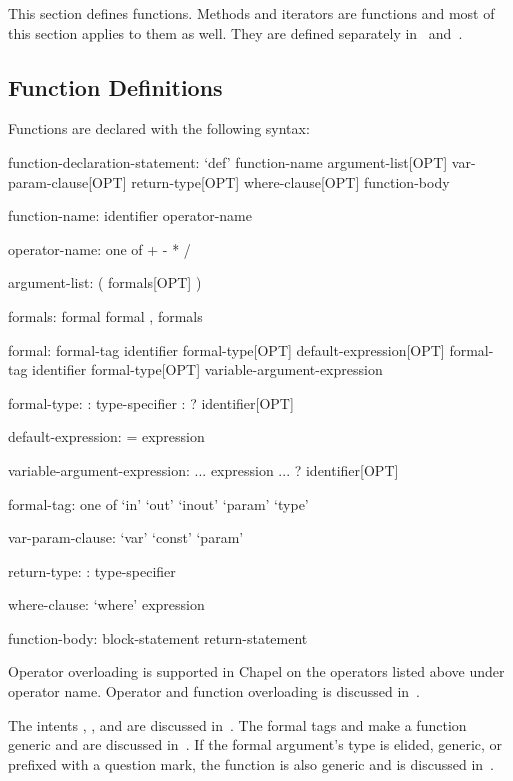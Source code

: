 \label{Functions}

This section defines functions.  Methods and iterators are functions
and most of this section applies to them as well.  They are defined
separately in~ and~.

\subsection{Function Definitions}
\label{Function_Definitions}

Functions are declared with the following syntax:
\begin{syntax}
function-declaration-statement:
  `def' function-name argument-list[OPT] var-param-clause[OPT]
    return-type[OPT] where-clause[OPT] function-body

function-name:
  identifier
  operator-name

operator-name: one of
  + - * / %

argument-list:
  ( formals[OPT] )

formals:
  formal
  formal , formals

formal:
  formal-tag identifier formal-type[OPT] default-expression[OPT]
  formal-tag identifier formal-type[OPT] variable-argument-expression

formal-type:
  : type-specifier
  : ? identifier[OPT]

default-expression:
  = expression

variable-argument-expression:
  ... expression
  ... ? identifier[OPT]

formal-tag: one of
  `in' `out' `inout' `param' `type'

var-param-clause:
  `var'
  `const'
  `param'

return-type:
  : type-specifier

where-clause:
  `where' expression

function-body:
  block-statement
  return-statement
\end{syntax}

Operator overloading is supported in Chapel on the operators listed
above under operator name.  Operator and function overloading is
discussed in~.

The intents , , and  are discussed
in~.  The formal tags  and  make
a function generic and are discussed in~.  If the
formal argument's type is elided, generic, or prefixed with a question
mark, the function is also generic and is discussed
in~.

